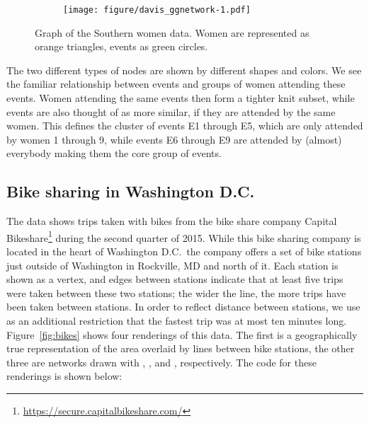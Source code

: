 \begin{figure}
\begin{subfigure}[t]{\textwidth}
\begin{adjustbox}{valign=t}
                  \begin{minipage}{.49\textwidth}

\texttt{[image: figure/davis\_ggnetwork-1.pdf]}

                          \end{minipage}

                          \end{adjustbox}
\end{subfigure}
\caption{\label{fig:davis} Graph of the Southern women data. Women are represented as orange triangles, events as green circles. }
\end{figure}

\noindent The two different types of nodes are shown by different shapes and colors. We see the familiar relationship between events and groups of women attending these events. Women attending the same events then form a tighter knit subset, while events are also thought of as more similar, if they are attended by the same women. This defines the cluster of events E1 through E5, which are only attended by women 1 through 9, while events E6 through E9 are attended by (almost) everybody making them the core group of events.   


\subsection{Bike sharing in Washington D.C.} 
  
The data shows trips taken with bikes from the bike share company Capital Bikeshare\footnote{\url{https://secure.capitalbikeshare.com/}} during the second quarter of 2015. While this bike sharing company is located in the heart of Washington D.C.\ the company offers a set of bike stations just outside of Washington in Rockville, MD and north of it. Each station is shown as a vertex, and edges between stations indicate that at least five trips were taken between these two stations; the wider the line, the more trips have been taken between stations. In order to reflect distance between stations, we use as an additional restriction that the fastest trip was at most ten minutes long.
Figure~\ref{fig:bikes} shows four renderings of this data. The first is a geographically true representation of the area overlaid by lines between bike stations, the other three are networks drawn with , , and , respectively. 
The code for these renderings is shown below:


